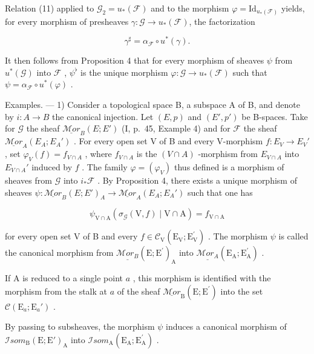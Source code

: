 Relation (11) applied to \(\mathcal{G}_2 = u_*(\mathcal{F})\) and to the morphism \(\varphi = \mathrm{Id}_{u_*(\mathcal{F})}\) yields, for every morphism of presheaves \(\gamma\colon\mathcal{G}\to u_*(\mathcal{F})\), the factorization

\[
\gamma^ {\sharp} = \alpha_ {\mathcal {F}} \circ u ^ {*} (\gamma).
\]

It then follows from Proposition 4 that for every morphism of sheaves \(\psi\) from \(u^{*}(\mathcal{G})\) into \(\mathcal{F}\) , \(\psi^{\flat}\) is the unique morphism \(\varphi\colon\mathcal{G}\to u_{*}(\mathcal{F})\) such that \(\psi=\alpha_{\mathcal{F}}\circ u^{*}(\varphi)\) .

Examples. --- 1) Consider a topological space B, a subspace A of B, and denote by \(i\colon A \to B\) the canonical injection. Let \((E,p)\) and \((E',p')\) be B-spaces. Take for \(\mathcal{G}\) the sheaf \(\underline{\mathcal{M}or}_{B}(E;E')\) (I, p.~45, Example 4) and for \(\mathcal{F}\) the sheaf \(\underline{\mathcal{M}or}_{A}(E_{A};E_{A}')\) . For every open set V of B and every V-morphism \(f\colon E_{V} \to E_{V}'\) , set \(\varphi_{V}(f) = f_{V \cap A}\) , where \(f_{V \cap A}\) is the \((V \cap A)\) -morphism from \(E_{V \cap A}\) into \(E_{V \cap A}'\) induced by \(f\) . The family \(\varphi = (\varphi_{V})\) thus defined is a morphism of sheaves from \(\mathcal{G}\) into \(i_*\mathcal{F}\) . By Proposition 4, there exists a unique morphism of sheaves \(\psi\colon \underline{\mathcal{M}or}_{B}(E;E')_{A} \to \underline{\mathcal{M}or}_{A}(E_{A};E_{A}')\) such that one has

\[
\psi_ {\mathrm{V} \cap \mathrm{A}} (\sigma_ {\mathcal {G}} (\mathrm{V}, f) \mid \mathrm{V} \cap \mathrm{A}) = f _ {\mathrm{V} \cap \mathrm{A}}\tag{12}
\]

for every open set V of B and every \(f \in \mathcal{C}_{\mathrm{V}}(\mathrm{E}_{\mathrm{V}}; \mathrm{E}_{\mathrm{V}}^{\prime})\) . The morphism \(\psi\) is called the canonical morphism from \(\underline{\mathcal{M}or_{B}}(\mathrm{E}; \mathrm{E}^{\prime})_{\mathrm{A}}\) into \(\underline{\mathcal{M}or_{A}}(\mathrm{E}_{\mathrm{A}}; \mathrm{E}_{\mathrm{A}}^{\prime})\) .

If A is reduced to a single point \(a\) , this morphism is identified with the morphism from the stalk at \(a\) of the sheaf \(\underline{\mathcal{M}or}_{\mathrm{B}}(\mathrm{E};\mathrm{E}^{\prime})\) into the set \(\mathcal{C}(\mathrm{E}_a;\mathrm{E}_a')\) .

By passing to subsheaves, the morphism \(\psi\) induces a canonical morphism of \(\mathcal{I}som_{\mathrm{B}}(\mathrm{E};\mathrm{E}')_{\mathrm{A}}\) into \(\mathcal{I}som_{\mathrm{A}}(\mathrm{E}_{\mathrm{A}};\mathrm{E}_{\mathrm{A}}^{\prime})\) .

